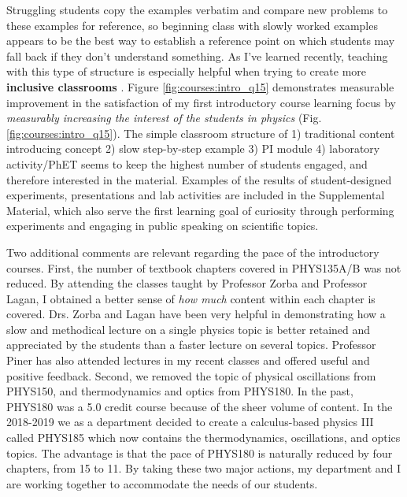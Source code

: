\documentclass[../../main.tex]{subfiles}
\begin{document}
Struggling students copy the examples verbatim and compare new problems to these examples for reference, so beginning class with slowly worked examples appears to be the best way to establish a reference point on which students may fall back if they don't understand something.  As I've learned recently, teaching with this type of structure is especially helpful when trying to create more \textbf{inclusive classrooms} \cite{inclusive}. Figure \ref{fig:courses:intro_q15} demonstrates measurable improvement in the satisfaction of my first introductory course learning focus by \textit{measurably increasing the interest of the students in physics} (Fig. \ref{fig:courses:intro_q15}).  The simple classroom structure of 1) traditional content introducing concept 2) slow step-by-step example 3) PI module 4) laboratory activity/PhET seems to keep the highest number of students engaged, and therefore interested in the material. Examples of the results of student-designed experiments, presentations and lab activities are included in the Supplemental Material, which also serve the first learning goal of curiosity through performing experiments and engaging in public speaking on scientific topics.\\ \hspace{0.1cm}

Two additional comments are relevant regarding the pace of the introductory courses.  First, the number of textbook chapters covered in PHYS135A/B was not reduced.  By attending the classes taught by Professor Zorba and Professor Lagan, I obtained a better sense of \textit{how much} content within each chapter is covered.  Drs. Zorba and Lagan have been very helpful in demonstrating how a slow and methodical lecture on a single physics topic is better retained and appreciated by the students than a faster lecture on several topics.  Professor Piner has also attended lectures in my recent classes and offered useful and positive feedback.  Second, we removed the topic of physical oscillations from PHYS150, and thermodynamics and optics from PHYS180.  In the past, PHYS180 was a 5.0 credit course because of the sheer volume of content.  In the 2018-2019 we as a department decided to create a calculus-based physics III called PHYS185 which now contains the thermodynamics, oscillations, and optics topics.  The advantage is that the pace of PHYS180 is naturally reduced by four chapters, from 15 to 11.  By taking these two major actions, my department and I are working together to accommodate the needs of our students. \\ \hspace{0.1cm}
\end{document}
